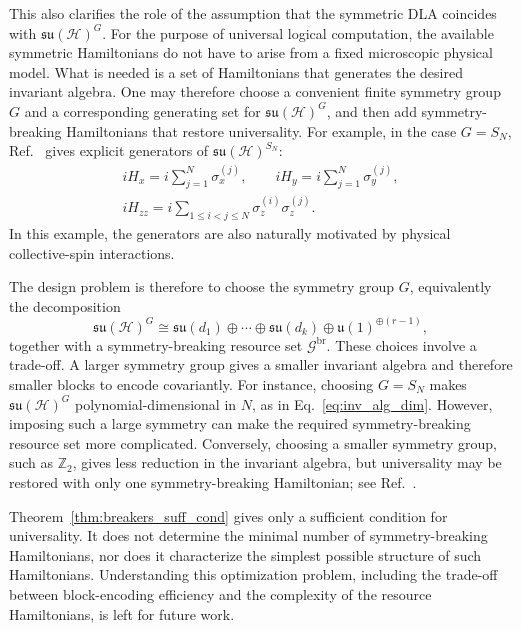 \documentclass[10pt,twocolumn,superscriptaddress,aps,amsmath,amssymb,citeautoscript,floatfix,prx,longbibliography]{revtex4-2}
\newcounter{alg}
\theoremstyle{plain}
\theoremstyle{plain}
\theoremstyle{plain}
\theoremstyle{plain}
\theoremstyle{plain}
\theoremstyle{plain}
\begin{document}
This also clarifies the role of the assumption that the symmetric DLA coincides with $\mathfrak{su}(\mathcal H)^G$. For the purpose of universal logical computation, the available symmetric Hamiltonians do not have to arise from a fixed microscopic physical model. What is needed is a set of Hamiltonians that generates the desired invariant algebra. One may therefore choose a convenient finite symmetry group $G$ and a corresponding generating set for $\mathfrak{su}(\mathcal H)^G$, and then add symmetry-breaking Hamiltonians that restore universality. For example, in the case $G=S_N$, Ref.~\cite{Albertini2018} gives explicit generators of $\mathfrak{su}(\mathcal H)^{S_N}$:
$$
\begin{gathered}
    iH_x
    =
    i\sum_{j=1}^N \sigma_x^{(j)},
    \qquad
    iH_y
    =
    i\sum_{j=1}^N \sigma_y^{(j)},
    \\
    iH_{zz}
    =
    i\sum_{1\le i<j\le N}
    \sigma_z^{(i)}\sigma_z^{(j)} .
\end{gathered}
$$
In this example, the generators are also naturally motivated by physical collective-spin interactions.

The design problem is therefore to choose the symmetry group $G$, equivalently the decomposition
$$
    \mathfrak{su}(\mathcal H)^G
    \cong
    \mathfrak{su}(d_1)
    \oplus
    \cdots
    \oplus
    \mathfrak{su}(d_k)
    \oplus
    \mathfrak{u}(1)^{\oplus(r-1)},
$$
together with a symmetry-breaking resource set $\mathcal G^{\mathrm{br}}$. These choices involve a trade-off. A larger symmetry group gives a smaller invariant algebra and therefore smaller blocks to encode covariantly. For instance, choosing $G=S_N$ makes $\mathfrak{su}(\mathcal H)^G$ polynomial-dimensional in $N$, as in Eq.~\eqref{eq:inv_alg_dim}. However, imposing such a large symmetry can make the required symmetry-breaking resource set more complicated. Conversely, choosing a smaller symmetry group, such as $\mathbb Z_2$, gives less reduction in the invariant algebra, but universality may be restored with only one symmetry-breaking Hamiltonian; see Ref.~\cite{Hu2025}.

Theorem~\ref{thm:breakers_suff_cond} gives only a sufficient condition for universality. It does not determine the minimal number of symmetry-breaking Hamiltonians, nor does it characterize the simplest possible structure of such Hamiltonians. Understanding this optimization problem, including the trade-off between block-encoding efficiency and the complexity of the resource Hamiltonians, is left for future work.
\end{document}
